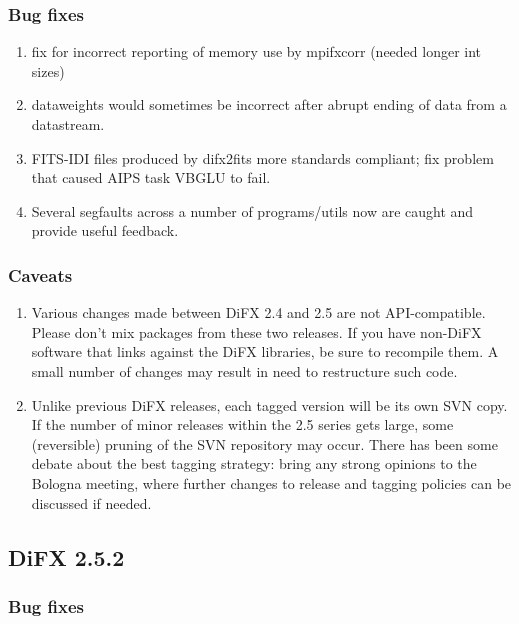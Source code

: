\subsubsection{Bug fixes}

\begin{enumerate}

\item fix for incorrect reporting of memory use by mpifxcorr (needed longer int sizes)
\item dataweights would sometimes be incorrect after abrupt ending of data from a datastream.
\item FITS-IDI files produced by difx2fits more standards compliant; fix problem that caused AIPS task VBGLU to fail.
\item Several segfaults across a number of programs/utils now are caught and provide useful feedback. 

\end{enumerate}

\subsubsection{Caveats}

\begin{enumerate}

\item Various changes made between DiFX 2.4 and 2.5 are not API-compatible. Please don't mix packages from these two releases.  If you have non-DiFX software that links against the DiFX libraries, be sure to recompile them. A small number of changes may result in need to restructure such code.
\item Unlike previous DiFX releases, each tagged version will be its own SVN copy. If the number of minor releases within the 2.5 series gets large, some (reversible) pruning of the SVN repository may occur.  There has been some debate about the best tagging strategy: bring any strong opinions to the Bologna meeting, where further changes to release and tagging policies can be discussed if needed.

\end{enumerate}


\subsection{DiFX 2.5.2}

\subsubsection{Bug fixes}

